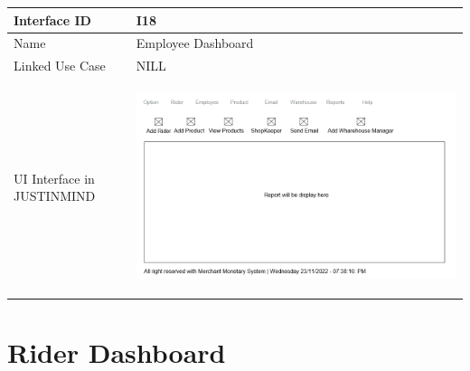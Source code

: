\documentclass[12pt,a4paper]{report}
\begin{document}
\begin{tabular}{ | m{3cm} | m{12cm}| } \hline

Interface ID & I18  \\\hline

Name  &  Employee Dashboard \\ \hline

Linked Use Case &  NILL \\ \hline

UI Interface in JUSTINMIND & \begin{center} \includegraphics[scale=0.3]{./UIs for Latex Reports/UI-018 Employee Dashboard@1x.png}\end{center}  \\ \hline

\end{tabular} 
\section{Rider Dashboard }
\end{document}
